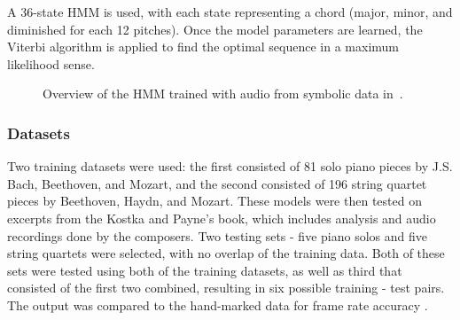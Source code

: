\documentclass{sig-alternate}
\begin{document}
A 36-state HMM is used, with each state representing a chord (major, minor, and diminished for each 12 pitches). Once the model parameters are learned, the Viterbi algorithm is applied to find the optimal sequence in a maximum likelihood sense. 




\begin{figure}
\centering
{}
\caption{Overview of the HMM trained with audio from symbolic data in~\cite{Lee:2006}.}
\label{fig:fig1}
\end{figure}

\subsubsection{Datasets}

Two training datasets were used: the first consisted of 81 solo piano pieces by J.S. Bach, Beethoven, and Mozart, and the second consisted of 196 string quartet pieces by Beethoven, Haydn, and Mozart. These models were then tested on excerpts from the Kostka and Payne's book, which includes analysis and audio recordings done by the composers. Two testing sets - five piano solos and five string quartets were selected, with no overlap of the training data. Both of these sets were tested using both of the training datasets, as well as third that consisted of the first two combined, resulting in six possible training - test pairs. The output was compared to the hand-marked data for frame rate accuracy \cite{Lee:2006}. 
\end{document}
